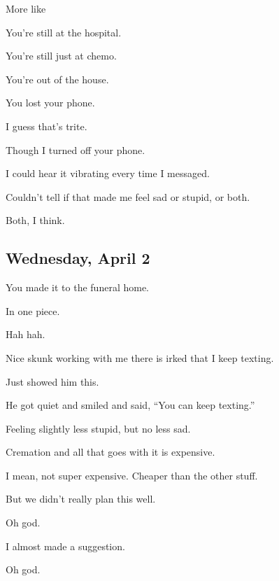 { More like

 You're still at the hospital.

 You're still just at chemo.

 You're out of the house.

 You lost your phone.

 I guess that's trite.

 Though I turned off your phone.

 I could hear it vibrating every time I messaged.

 Couldn't tell if that made me feel sad or stupid, or both.

 Both, I think.

\newpage

\subsection*{Wednesday, April 2}\label{wednesday-april-2}

 You made it to the funeral home.

 In one piece.

 Hah hah.

 Nice skunk working with me there is irked that I keep texting.

 Just showed him this.

 He got quiet and smiled and said, ``You can keep texting.''

 Feeling slightly less stupid, but no less sad.

 Cremation and all that goes with it is expensive.

 I mean, not super expensive. Cheaper than the other stuff.

 But we didn't really plan this well.

 Oh god.

 I almost made a suggestion.

 Oh god.

}
